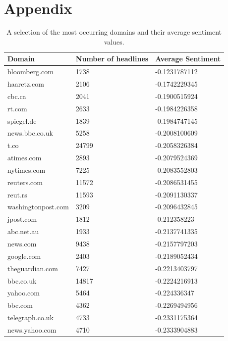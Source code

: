 \documentclass[final]{ieee}
\begin{document}
\newpage

\hbox{}


\newpage

\thispagestyle{empty}

\onecolumn

\section*{Appendix}

\begin{table}[htb]
\caption{A selection of the most occurring domains and their average sentiment values.}
\begin{tabularx}{\textwidth}{X|l|l}
Domain & Number of headlines & Average Sentiment \\ \hline
bloomberg.com & 1738 & -0.1231787112 \\ \hline
haaretz.com & 2106 & -0.1742229345 \\ \hline
cbc.ca & 2041 & -0.1900515924 \\ \hline
rt.com & 2633 & -0.1984226358 \\ \hline
spiegel.de & 1839 & -0.1984747145 \\ \hline
news.bbc.co.uk & 5258 & -0.2008100609 \\ \hline
t.co & 24799 & -0.2058326384 \\ \hline
atimes.com & 2893 & -0.2079524369 \\ \hline
nytimes.com & 7225 & -0.2083552803 \\ \hline
reuters.com & 11572 & -0.2086531455 \\ \hline
reut.rs & 11593 & -0.2091130337 \\ \hline
washingtonpost.com & 3209 & -0.2096432845 \\ \hline
jpost.com & 1812 & -0.212358223 \\ \hline
abc.net.au & 1933 & -0.2137741335 \\ \hline
news.com & 9438 & -0.2157797203 \\ \hline
google.com & 2403 & -0.2189052434 \\ \hline
theguardian.com & 7427 & -0.2213403797 \\ \hline
bbc.co.uk & 14817 & -0.2224216913 \\ \hline
yahoo.com & 5464 & -0.224336347 \\ \hline
bbc.com & 4362 & -0.2269494956 \\ \hline
telegraph.co.uk & 4733 & -0.2331175364 \\ \hline
news.yahoo.com & 4710 & -0.2333904883 \\ \hline

\end{tabularx}
\end{table}
\end{document}
